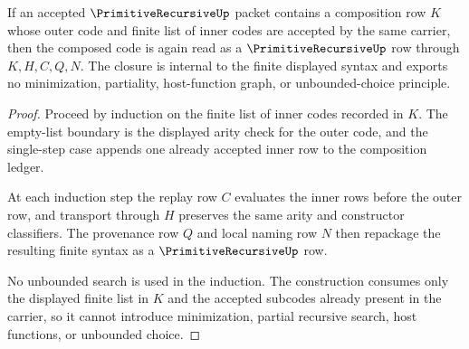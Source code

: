 \begin{theorem}
\label{thm:primitive-recursive-composition-closure}
If an accepted $\PrimitiveRecursiveUp$ packet contains a composition row $K$ whose outer code and finite list of inner codes are accepted by the same carrier, then the composed code is again read as a $\PrimitiveRecursiveUp$ row through $K,H,C,Q,N$. The closure is internal to the finite displayed syntax and exports no minimization, partiality, host-function graph, or unbounded-choice principle.
\end{theorem}
\begin{proof}
Proceed by induction on the finite list of inner codes recorded in $K$. The empty-list boundary is the displayed arity check for the outer code, and the single-step case appends one already accepted inner row to the composition ledger.

At each induction step the replay row $C$ evaluates the inner rows before the outer row, and transport through $H$ preserves the same arity and constructor classifiers. The provenance row $Q$ and local naming row $N$ then repackage the resulting finite syntax as a $\PrimitiveRecursiveUp$ row.

No unbounded search is used in the induction. The construction consumes only the displayed finite list in $K$ and the accepted subcodes already present in the carrier, so it cannot introduce minimization, partial recursive search, host functions, or unbounded choice.
\end{proof}

\begin{closurestatus}{\PrimitiveRecursiveUp}
  \theoryclosure{\seedClosure}
  \formalstatus{\unformalizedV}
\end{closurestatus}
